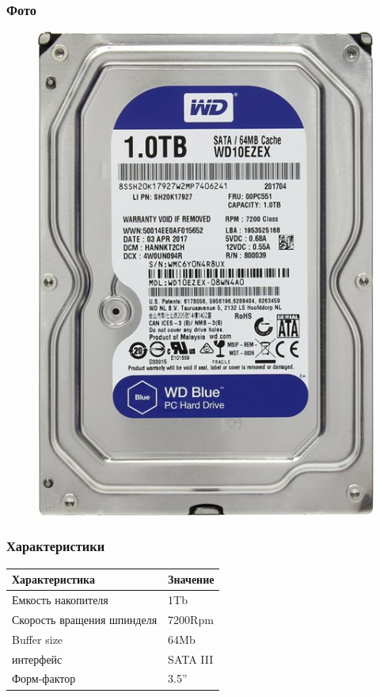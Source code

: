 \documentclass[a4paper]{article}
\begin{document}
\subsubsection{Фото}
\begin{figure}[H]
\centering
\includegraphics[scale=0.3]{harddrive.jpg} 
\end{figure}
\subsubsection{Характеристики}
\begin{table}[H]
    \centering
    \begin{tabular}{|l|l|}
    \hline
    Характеристика & Значение \\
    \hline
    Емкость накопителя & 1Tb \\
    Скорость вращения шпинделя & 7200Rpm \\
    Buffer size & 64Mb \\
    интерфейс & SATA III \\
    Форм-фактор & 3.5'' \\
    \hline
\end{tabular}
\end{table}
\end{document}

